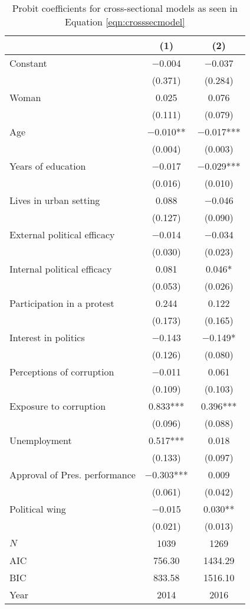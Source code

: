 \documentclass[12pt,a4]{article}
\begin{document}
\begin{table}[htbp]
\begin{center}
\caption{Probit coefficients for cross-sectional models as seen in Equation \ref{eqn:crosssecmodel}}
\label{tab:complexmodcprob}

\begin{tabular}[t]{lcc}
\toprule
  & (1) & (2)\\
\midrule
Constant & \num{-0.004} & \num{-0.037}\\
 & (\num{0.371}) & (\num{0.284})\\
Woman & \num{0.025} & \num{0.076}\\
 & (\num{0.111}) & (\num{0.079})\\
Age & \num{-0.010}** & \num{-0.017}***\\
 & (\num{0.004}) & (\num{0.003})\\
Years of education & \num{-0.017} & \num{-0.029}***\\
 & (\num{0.016}) & (\num{0.010})\\
Lives in urban setting & \num{0.088} & \num{-0.046}\\
 & (\num{0.127}) & (\num{0.090})\\
External political efficacy & \num{-0.014} & \num{-0.034}\\
 & (\num{0.030}) & (\num{0.023})\\
Internal political efficacy & \num{0.081} & \num{0.046}*\\
 & (\num{0.053}) & (\num{0.026})\\
Participation in a protest & \num{0.244} & \num{0.122}\\
 & (\num{0.173}) & (\num{0.165})\\
Interest in politics & \num{-0.143} & \num{-0.149}*\\
 & (\num{0.126}) & (\num{0.080})\\
Perceptions of corruption & \num{-0.011} & \num{0.061}\\
 & (\num{0.109}) & (\num{0.103})\\
Exposure to corruption & \num{0.833}*** & \num{0.396}***\\
 & (\num{0.096}) & (\num{0.088})\\
Unemployment & \num{0.517}*** & \num{0.018}\\
 & (\num{0.133}) & (\num{0.097})\\
Approval of Pres. performance & \num{-0.303}*** & \num{0.009}\\
 & (\num{0.061}) & (\num{0.042})\\
Political wing & \num{-0.015} & \num{0.030}**\\
 & (\num{0.021}) & (\num{0.013})\\
\midrule
$N$ & \num{1039} & \num{1269}\\
AIC & \num{756.30} & \num{1434.29}\\
BIC & \num{833.58} & \num{1516.10}\\
Year & 2014 & 2016\\
\bottomrule
\end{tabular}



\end{center}
\end{table}
\end{document}
